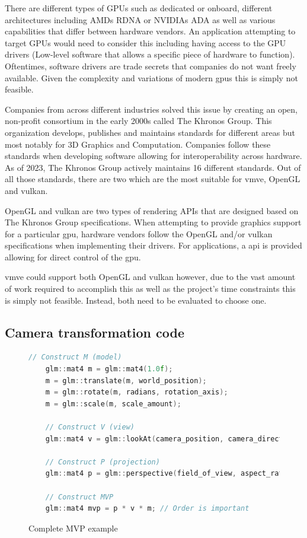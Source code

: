 \documentclass[11pt]{article}
\begin{document}
There are different types of GPUs such as dedicated or onboard, different
architectures including AMDs RDNA \cite{RDNA} or NVIDIAs ADA \cite{ADA} as well
as various capabilities that differ between hardware vendors. An application
attempting to target GPUs would need to consider this including having access to
the GPU drivers (Low-level software that allows a specific piece of hardware to
function). Oftentimes, software drivers are trade secrets that companies do not
want freely available. Given the complexity and variations of modern
\glspl*{gpu} this is simply not feasible.

Companies from across different industries solved this issue by creating
an open, non-profit consortium in the early 2000s called The Khronos Group. This
organization develops, publishes and maintains standards for different areas
but most notably for 3D Graphics and Computation. Companies follow these 
standards when developing software allowing for interoperability across
hardware. As of 2023, The Khronos Group actively maintains 16 different
standards. Out of all those standards, there are two which are the most
suitable for \gls*{vmve}, OpenGL and \gls*{vulkan}.

OpenGL and \gls*{vulkan} are two types of rendering APIs that are designed based on
The Khronos Group specifications. When attempting to provide graphics support
for a particular \gls*{gpu}, hardware vendors follow the OpenGL and/or \gls*{vulkan}
specifications when implementing their drivers. For applications, a
\gls*{api} is provided allowing for direct control of the \gls*{gpu}.

\gls*{vmve} could support both OpenGL and \gls*{vulkan} however, due to the vast
amount of work required to accomplish this as well as the project's time
constraints this is simply not feasible. Instead, both need to be evaluated to
choose one.


\subsection{Camera transformation code}
\begin{figure}[H]
  \centering
  \begin{lstlisting}[language=C++]
    // Construct M (model)
    glm::mat4 m = glm::mat4(1.0f);
    m = glm::translate(m, world_position);   
    m = glm::rotate(m, radians, rotation_axis); 
    m = glm::scale(m, scale_amount);

    // Construct V (view)
    glm::mat4 v = glm::lookAt(camera_position, camera_direction, camera_up);

    // Construct P (projection)
    glm::mat4 p = glm::perspective(field_of_view, aspect_ratio, near, far);

    // Construct MVP
    glm::mat4 mvp = p * v * m; // Order is important

  \end{lstlisting}
  \caption{Complete MVP example}
  \label{fig:local_to_world_appendix}
\end{figure}
\end{document}
